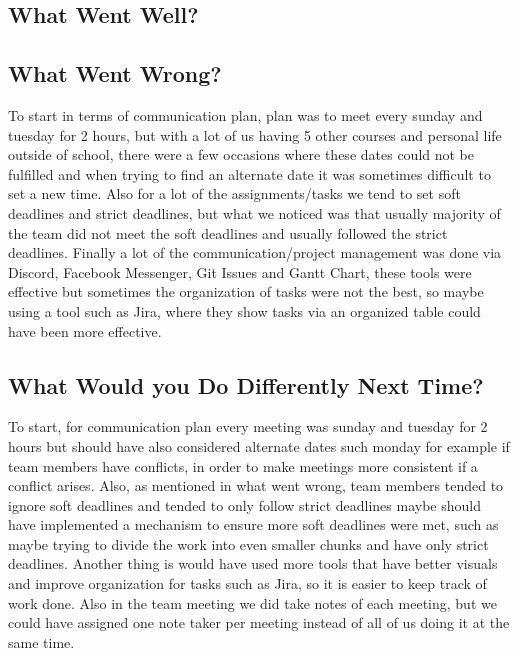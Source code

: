 \documentclass{article}
\begin{document}
\subsection{What Went Well?}


\subsection{What Went Wrong?}

To start in terms of communication plan, plan was to meet every sunday and tuesday for 2 hours, but with a lot of us having 5 other courses and personal life outside of school, there were a few occasions where these dates could not be fulfilled and when trying to find an alternate date it was sometimes difficult to set a new time. Also for a lot of the assignments/tasks we tend to set soft deadlines and strict deadlines, but what we noticed was that usually majority of the team did not meet the soft deadlines and usually followed the strict deadlines. Finally a lot of the communication/project management was done via Discord, Facebook Messenger, Git Issues and Gantt Chart, these tools were effective but sometimes the organization of tasks were not the best, so maybe using a tool such as Jira, where they show tasks via an organized table could have been more effective.

\subsection{What Would you Do Differently Next Time?}

To start, for communication plan every meeting was sunday and tuesday for 2 hours but should have also considered alternate dates such monday for example if team members have conflicts, in order to make meetings more consistent if a conflict arises. Also, as mentioned in what went wrong, team members tended to ignore soft deadlines and tended to only follow strict deadlines maybe should have implemented a mechanism to ensure more soft deadlines were met, such as maybe trying to divide the work into even smaller chunks and have only strict deadlines. Another thing is would have used more tools that have better visuals and improve organization for tasks such as Jira, so it is easier to keep track of work done. Also in the team meeting we did take notes of each meeting, but we could have assigned one note taker per meeting instead of all of us doing it at the same time.
\end{document}
